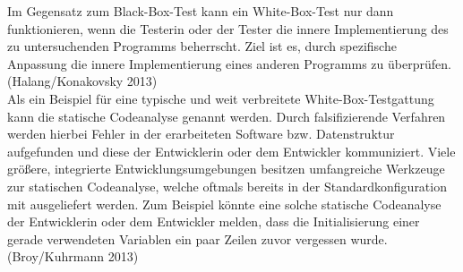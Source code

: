 \documentclass{article}
\begin{document}
        Im Gegensatz zum Black-Box-Test kann ein White-Box-Test nur dann funktionieren, wenn die Testerin oder der Tester die innere Implementierung des zu untersuchenden Programms beherrscht. Ziel ist es, durch spezifische Anpassung die innere Implementierung eines anderen Programms zu überprüfen. (Halang/Konakovsky 2013)\\
            
        Als ein Beispiel für eine typische und weit verbreitete White-Box-Testgattung kann die statische Codeanalyse genannt werden. Durch falsifizierende Verfahren werden hierbei Fehler in der erarbeiteten Software bzw. Datenstruktur aufgefunden und diese der Entwicklerin oder dem Entwickler kommuniziert. Viele größere, integrierte Entwicklungsumgebungen besitzen umfangreiche Werkzeuge zur statischen Codeanalyse, welche oftmals bereits in der Standardkonfiguration mit ausgeliefert werden. Zum Beispiel könnte eine solche statische Codeanalyse der Entwicklerin oder dem Entwickler melden, dass die Initialisierung einer gerade verwendeten Variablen ein paar Zeilen zuvor vergessen wurde.  (Broy/Kuhrmann 2013)\\
            
\end{document}

